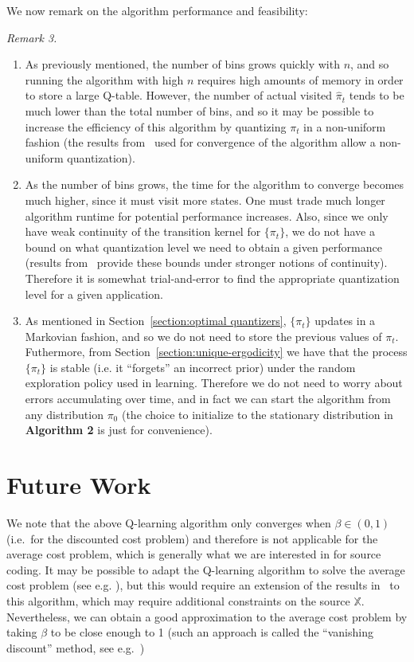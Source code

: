 \documentclass{article}
\begin{document}
We now remark on the algorithm performance and feasibility:

\vspace{1em}
\noindent\emph{Remark 3.}\label{remark:3}
\begin{enumerate}
    \item As previously mentioned, the number of bins grows quickly with \(n\), and so running the algorithm with high \(n\) requires high amounts of memory in order to store a large Q-table. However, the number of actual visited \(\hat{\pi}_t\) tends to be much lower than the total number of bins, and so it may be possible to increase the efficiency of this algorithm by quantizing \( \pi_t \) in a non-uniform fashion (the results from~\cite{Kara} used for convergence of the algorithm allow a non-uniform quantization).
    \item As the number of bins grows, the time for the algorithm to converge becomes much higher, since it must visit more states. One must trade much longer algorithm runtime for potential performance increases. Also, since  we only have weak continuity of the transition kernel for \(\{\pi_t\}\), we do not have a bound on what quantization level we need to obtain a given performance (results from~\cite{Kara} provide these bounds under stronger notions of continuity). Therefore it is somewhat trial-and-error to find the appropriate quantization level for a given application.
    \item As mentioned in Section~\ref{section:optimal quantizers}, \(\{\pi_t\}\) updates in a Markovian fashion, and so we do not need to store the previous values of \(\pi_t\). Futhermore, from Section~\ref{section:unique-ergodicity} we have that the process \(\{\pi_t\}\) is stable (i.e. it ``forgets'' an incorrect prior) under the random exploration policy used in learning. Therefore we do not need to worry about errors accumulating over time, and in fact we can start the algorithm from any distribution \(\pi_0\) (the choice to initialize to the stationary distribution in \textbf{Algorithm 2} is just for convenience).
\end{enumerate}

\section{Future Work}
We note that the above Q-learning algorithm only converges when \( \beta \in (0,1) \) (i.e.\ for the discounted cost problem) and therefore is not applicable for the average cost problem, which is generally what we are interested in for source coding. It may be possible to adapt the Q-learning algorithm to solve the average cost problem (see e.g. \cite{Abounadi}), but this would require an extension of the results in~\cite{Kara} to this algorithm, which may require additional constraints on the source \( \mathbb{X} \). Nevertheless, we can obtain a good approximation to the average cost problem by taking \(\beta\) to be close enough to 1 (such an approach is called the ``vanishing discount'' method, see e.g.~\cite[Chapter 5]{Lerma})
\end{document}
